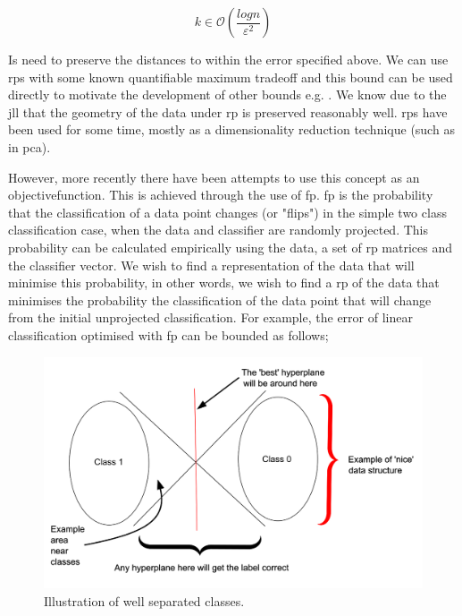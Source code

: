 \begin{equation}
k \in \mathcal{O} (\frac{log n}{\varepsilon^2})  
\end{equation}

Is need to preserve the distances to within the error specified above. We can use \gls{rp}s with some known quantifiable maximum tradeoff and this bound can be used directly to motivate the development of other bounds e.g. \cite{bob_sharp_generalisation_error_bounds}. We know due to the \gls{jll} that the geometry of the data under \gls{rp} is preserved reasonably well. \gls{rp}s have been used for some time, mostly as a dimensionality reduction technique (such as in \gls{pca}).
\bigskip


However, more recently there have been attempts to use this concept as an \gls{objectivefunction}. This is achieved through the use of \gls{fp}. \gls{fp} is the probability that the classification of a data point changes (or "flips") in the simple two class classification case, when the data and classifier are randomly projected. This probability can be calculated empirically using the data, a set of \gls{rp} matrices and the classifier vector. We wish to find a representation of the data that will minimise this probability, in other words, we wish to find a \gls{rp} of the data that minimises the probability the classification of the data point that will change from the initial unprojected classification. For example, the error of linear classification optimised with \gls{fp} can be bounded as follows;




\begin{figure}[H]
\centering
\includegraphics[width=\textwidth]{figs/hyperplanes_good_classes.png}
%
\caption{Illustration of well separated classes.} 
\label{fig:good_sep_classes} %
\end{figure}

